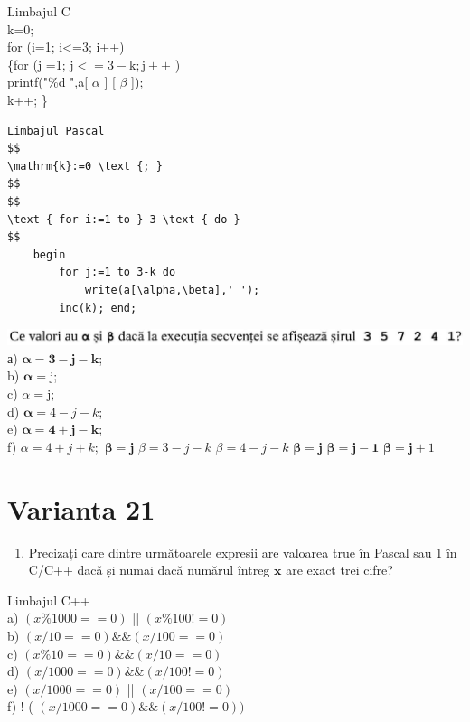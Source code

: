 \documentclass[10pt]{article}
\begin{document}
Limbajul C\\
k=0;\\
for (i=1; i<=3; i++)\\
\{for (j =1; $\mathrm{j}<=3-\mathrm{k} ; \mathrm{j}++$ )\\
printf("\%d ",a[ $\alpha$ ] [ $\beta$ ]);\\
k++; \}

\begin{verbatim}
Limbajul Pascal
$$
\mathrm{k}:=0 \text {; }
$$
$$
\text { for i:=1 to } 3 \text { do }
$$
    begin
        for j:=1 to 3-k do
            write(a[\alpha,\beta],' ');
        inc(k); end;
\end{verbatim}

\includegraphics[max width=\textwidth, center]{2025_04_17_46e04c6acd873ea9558dg-109}\\
а) $\boldsymbol{\alpha}=\mathbf{3}-\mathbf{j}-\mathbf{k}$;\\
b) $\boldsymbol{\alpha}=\mathrm{j}$;\\
c) $\alpha=\mathrm{j}$;\\
d) $\boldsymbol{\alpha}=4-j-k$;\\
e) $\boldsymbol{\alpha}=\mathbf{4}+\mathbf{j}-\mathbf{k}$;\\
f) $\alpha=4+j+k ;$ $\boldsymbol{\beta}=\mathbf{j}$ $\beta=3-j-k$ $\beta=4-j-k$ $\boldsymbol{\beta}=\mathbf{j}$ $\boldsymbol{\beta}=\mathbf{j}-\mathbf{1}$ $\boldsymbol{\beta}=\mathbf{j}+1$

\section*{Varianta 21}
\begin{enumerate}
  \item Precizați care dintre următoarele expresii are valoarea true în Pascal sau 1 în C/C++ dacă și numai dacă numărul întreg $\mathbf{x}$ are exact trei cifre?
\end{enumerate}

Limbajul C++\\
a) $(x \% 1000==0)$ || $(x \% 100!=0)$\\
b) $(x / 10==0) \& \&(x / 100==0)$\\
c) $(x \% 10==0) \& \&(x / 10==0)$\\
d) $(x / 1000==0) \& \&(x / 100!=0)$\\
e) $(x / 1000==0)$ || $(x / 100==0)$\\
f) ! ( $(x / 1000==0) \& \&(x / 100!=0))$
\end{document}
